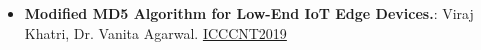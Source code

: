 \documentclass[letterpaper,11pt]{article}
\makeatletter
\newcommand{\resumeItem}[2]{
  \item\small{
    \textbf{#1}{: #2 \vspace{-2pt}}
  }
}
\newcommand{\resumeSubSubheading}[2]{
    \begin{tabular*}{0.97\textwidth}{l@{\extracolsep{\fill}}r}
      \textit{\small#1} & \textit{\small #2} \\
    \end{tabular*}\vspace{-5pt}
}
\newcommand{\resumeSubItem}[2]{\resumeItem{#1}{#2}\vspace{-4pt}}
\newcommand{\resumeSubHeadingListStart}{\begin{itemize}[leftmargin=*]}
\newcommand{\resumeSubHeadingListEnd}{\end{itemize}}
\makeatother
\begin{document}
	\resumeSubHeadingListStart
	\resumeSubItem
		{Modified MD5 Algorithm for Low-End IoT Edge Devices.}{Viraj Khatri, Dr. Vanita Agarwal. \href{https://doi.org/10.1109/ICCCNT45670.2019.8944533} {\color{urlcolor}ICCCNT2019}}

	\resumeSubHeadingListEnd

\end{document}
